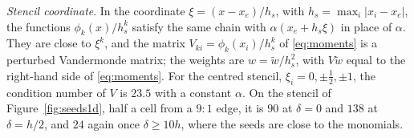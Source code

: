 \documentclass[11pt]{amsart}
\theoremstyle{definition}
\theoremstyle{remark}
\newcommand{\para}[1]{\par\smallskip\noindent\textit{#1}.\enspace}
\begin{document}
\para{Stencil coordinate}
In the coordinate $\xi = (x - x_e) / h_s$, with $h_s = \max_i |x_i - x_e|$,
the functions $\phi_k(x) / h_s^k$ satisfy the same chain with
$\alpha(x_e + h_s \xi)$ in place of $\alpha$. They are close to $\xi^k$, and
the matrix $V_{ki} = \phi_k(x_i) / h_s^k$ of \eqref{eq:moments} is a
perturbed Vandermonde matrix; the weights are $w = \tilde w / h_s^2$, with
$V \tilde w$ equal to the right-hand side of \eqref{eq:moments}. For the
centred stencil, $\xi_i = 0, \pm \tfrac12, \pm 1$, the condition number of
$V$ is $23.5$ with a constant $\alpha$. On the stencil of
Figure~\ref{fig:seeds1d}, half a cell from a $9 : 1$ edge, it is $90$ at
$\delta = 0$ and $138$ at $\delta = h/2$, and $24$ again once
$\delta \ge 10 h$, where the seeds are close to the monomials.
\end{document}
